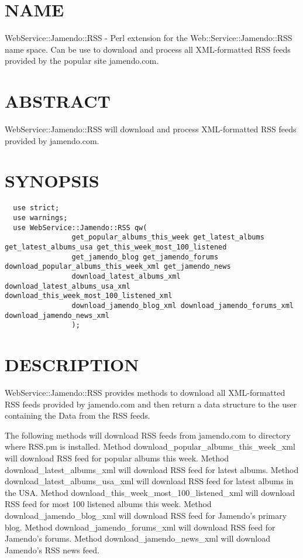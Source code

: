 \section{NAME\label{NAME}}


WebService::Jamendo::RSS - Perl extension for the Web::Service::Jamendo::RSS name space.  Can be use to download
and process all XML-formatted RSS feeds provided by the popular site jamendo.com.

\section{ABSTRACT\label{ABSTRACT}}


WebService::Jamendo::RSS will download and process XML-formatted RSS feeds provided by jamendo.com.

\section{SYNOPSIS\label{SYNOPSIS}}
\begin{verbatim}
  use strict;
  use warnings;
  use WebService::Jamendo::RSS qw(
                get_popular_albums_this_week get_latest_albums get_latest_albums_usa get_this_week_most_100_listened
                get_jamendo_blog get_jamendo_forums download_popular_albums_this_week_xml get_jamendo_news
                download_latest_albums_xml download_latest_albums_usa_xml download_this_week_most_100_listened_xml
                download_jamendo_blog_xml download_jamendo_forums_xml download_jamendo_news_xml
                );
\end{verbatim}
\section{DESCRIPTION\label{DESCRIPTION}}


WebService::Jamendo::RSS provides methods to download all XML-formatted RSS feeds provided by jamendo.com and 
then return a data structure to the user containing the Data from the RSS feeds.



The following methods will download RSS feeds from jamendo.com to directory where RSS.pm is installed.
Method download\_popular\_albums\_this\_week\_xml will download RSS feed for popular albums this week.
Method download\_latest\_albums\_xml will download RSS feed for latest albums.
Method download\_latest\_albums\_usa\_xml will download RSS feed for latest albums in the USA.
Method download\_this\_week\_most\_100\_listened\_xml will download RSS feed for most 100 listened albums this week.
Method download\_jamendo\_blog\_xml will download RSS feed for Jamendo's primary blog.
Method download\_jamendo\_forums\_xml will download RSS feed for Jamendo's forums.
Method download\_jamendo\_news\_xml will download Jamendo's RSS news feed.



